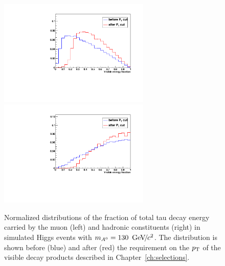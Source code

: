 \begin{figure}[t]
\begin{center}
\includegraphics*[width=72mm]{svfit_chapter/figures/scuplting_A130_muon.pdf}
\includegraphics*[width=72mm]{svfit_chapter/figures/scuplting_A130_tau.pdf}
\caption[Effect of the visible \pt requirements on muon and hadronic $\tau$
decays]{\captiontext Normalized distributions of the fraction of total tau decay
energy carried by the muon (left) and hadronic constituents (right) in simulated
Higgs events with \mbox{$m_{A^0} = 130~{\,\text{Ge\hspace{-.08em}V\hspace{-0.16em}/\hspace{-0.08em}}c^\text{2}}$}.  The distribution is shown before
(blue) and after (red) the requirement on the $p_{\mathrm{T}}$ of the visible decay
products described in Chapter~\ref{ch:selections}.  }
\label{fig:ptBalancePtVisCuts}
\end{center}
\end{figure} 

